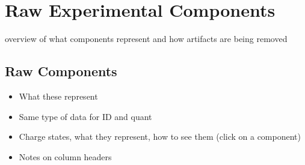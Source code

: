 
\section{Raw Experimental Components}
overview of what components represent and how artifacts are being removed

\subsection{Raw Components}
\begin{itemize}
	\item What these represent
	\item Same type of data for ID and quant
	\item Charge states, what they represent, how to see them (click on a component)
	\item Notes on column headers
\end{itemize}
